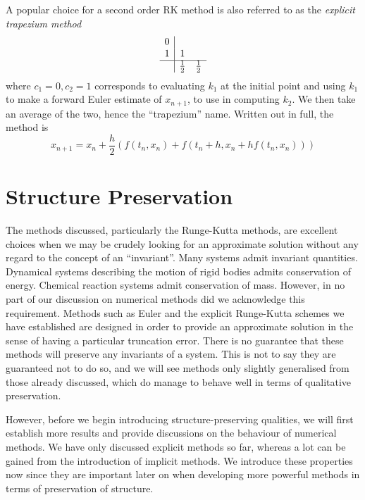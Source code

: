 A popular choice for a second order RK method is also referred to as the \textit{explicit trapezium method}
\begin{equation*}
    \begin{array}{c|cc}
		0 \\
        1  &1 \\
		\hline
		&\frac{1}{2} &\frac{1}{2}
	\end{array}
\end{equation*}
where $c_1 = 0, c_2 = 1$ corresponds to evaluating $k_1$ at the initial point and using $k_1$ to make a forward Euler estimate of $x_{n+1}$, to use in computing $k_2$.
We then take an average of the two, hence the ``trapezium'' name.
Written out in full, the method is
\begin{equation*}
    x_{n+1} = x_n + \frac{h}{2} \left(
        f(t_n, x_n) + f(t_n + h, x_n + h f(t_n, x_n))
    \right)
\end{equation*}

\section{Structure Preservation}

The methods discussed, particularly the Runge-Kutta methods, are excellent choices when we may be crudely looking for an approximate solution without any regard to the concept of an ``invariant''.
Many systems admit invariant quantities.
Dynamical systems describing the motion of rigid bodies admits conservation of energy.
Chemical reaction systems admit conservation of mass.
However, in no part of our discussion on numerical methods did we acknowledge this requirement.
Methods such as Euler and the explicit Runge-Kutta schemes we have established are designed in order to provide an approximate solution in the sense of having a particular truncation error.
There is no guarantee that these methods will preserve any invariants of a system.
This is not to say they are guaranteed not to do so,
and we will see methods only slightly generalised from those already discussed, which do manage to behave well in terms of qualitative preservation.

However, before we begin introducing structure-preserving qualities, we will first establish more results and provide discussions on the behaviour of numerical methods.
We have only discussed explicit methods so far, whereas a lot can be gained from the introduction of implicit methods.
We introduce these properties now since they are important later on when developing more powerful methods in terms of preservation of structure.

